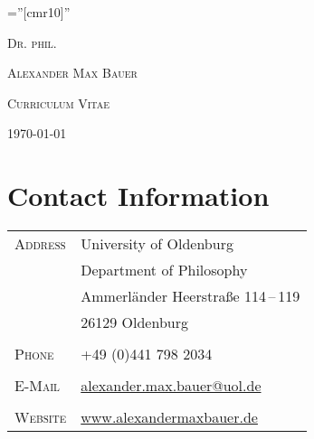 \documentclass[a4paper,10pt]{article}
\begin{document}
\pagestyle{plain}
\font\fb=''[cmr10]''

\par{\centering
   {\Large\textsc{Dr\hspace{0.5pt}. phil\hspace{0.5pt}.}
   }\bigskip\par}

\par{\centering
   {\Huge\textsc{Alexander Max Bauer}
   }\bigskip\par}

\vspace{1cm}
\par{\centering
   {\Large\textsc{Curriculum Vitae}
   }\bigskip\par}

\par{\centering
   {\Large\textsc{\monthyeardate\today}
   }\bigskip\par}

\vfill
\begin{center}
\end{center}
\vfill


\clearpage
\section{Contact Information}
\begin{longtable}{p{4cm}p{11.5cm}}
   \textsc{Address}     & University of Oldenburg\\
                        & Department of Philosophy\\
                        & Ammerländer Heerstraße 114\,--\,119\\
                        & 26129 Oldenburg\\
                        & \\
   \textsc{Phone}       & +49 (0)441 798 2034\\
                        & \\
   \textsc{E-Mail}      & \href{mailto:alexander.max.bauer@uol.de}{alexander.max.bauer@uol.de}\\
                        & \\
   \textsc{Website}     & \href{http://www.alexandermaxbauer.de/}{www.alexandermaxbauer.de}
\end{longtable}


\vspace{0.5cm}
\end{document}
